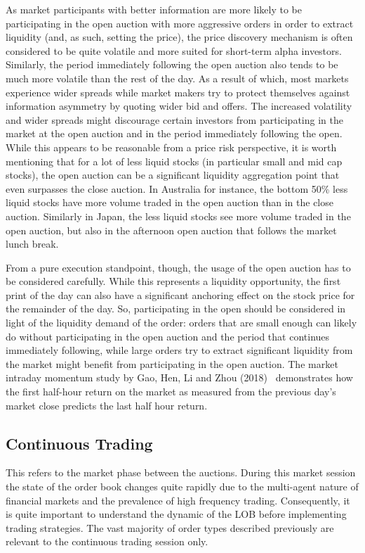 As market participants with better information are more likely to be participating in the open auction with more aggressive orders in order to extract liquidity (and, as such, setting the price), the price discovery mechanism is often considered to be quite volatile and more suited for short-term alpha investors. Similarly, the period immediately following the open auction also tends to be much more volatile than the rest of the day. As a result of which, most markets experience wider spreads while market makers try to protect themselves against information asymmetry by quoting wider bid and offers. The increased volatility and wider spreads might discourage certain investors from participating in the market at the open auction and in the period immediately following the open. While this appears to be reasonable from a price risk perspective, it is worth mentioning that for a lot of less liquid stocks (in particular small and mid cap stocks), the open auction can be a significant liquidity aggregation point that even surpasses the close auction. In Australia for instance, the bottom 50\% less liquid stocks have more volume traded in the open auction than in the close auction. Similarly in Japan, the less liquid stocks see more volume traded in the open auction, but also in the afternoon open auction that follows the market lunch break.


From a pure execution standpoint, though, the usage of the open auction has to be considered carefully. While this represents a liquidity opportunity, the first print of the day can also have a significant anchoring effect on the stock price for the remainder of the day. So, participating in the open should be considered in light of the liquidity demand of the order: orders that are small enough can likely do without participating in the open auction and the period that continues immediately following, while large orders try to extract significant liquidity from the market might benefit from participating in the open auction. The market intraday momentum study by Gao, Hen, Li and Zhou (2018)~\cite{ghliz} demonstrates how the first half-hour return on the market as measured from the previous day's market close predicts the last half hour return. \\



\subsection{Continuous Trading} 
This refers to the market phase between the auctions. During this market session  the state of the order book changes quite rapidly due to the multi-agent nature of financial markets and the prevalence of high frequency trading. Consequently, it is quite important to understand the dynamic of the LOB before implementing trading strategies. The vast majority of order types described previously are relevant to the continuous trading session only. \\

